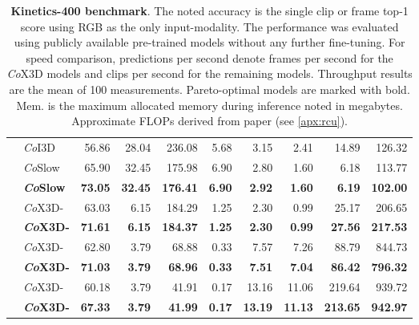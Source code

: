 \documentclass[runningheads]{llncs}
\begin{document}
\begin{table}[t]
\begin{center}
{\begin{tabular}{llrrrrrrrr}
    & \textit{Co}I3D             & 56.86     & 28.04    & 236.08    & 5.68       & 3.15   & 2.41     & 14.89     & 126.32 \\
    & \textit{Co}Slow             & 65.90     & 32.45    & 175.98    & 6.90       & 2.80   & 1.60     & 6.18      & 113.77 \\
    & \textbf{\textit{Co}Slow}    & \textbf{73.05}  & \textbf{32.45}  & \textbf{176.41}  & \textbf{6.90}   & \textbf{2.92}   & \textbf{1.60}  & \textbf{6.19} & \textbf{102.00}  \\
    & \textit{Co}X3D-    & 63.03     & 6.15     & 184.29    & 1.25       & 2.30   & 0.99     & 25.17     & 206.65 \\
    & \textbf{\textit{Co}X3D-}    & \textbf{71.61}     & \textbf{6.15}    & \textbf{184.37}     & \textbf{1.25}      &  \textbf{2.30}   & \textbf{0.99}       & \textbf{27.56}       & \textbf{217.53}  \\
    & \textit{Co}X3D-    & 62.80     & 3.79    & 68.88     & 0.33      & 7.57   & 7.26       & 88.79      & 844.73  \\
    & \textbf{\textit{Co}X3D-}    & \textbf{71.03}     & \textbf{3.79}    & \textbf{68.96}    & \textbf{0.33}      & \textbf{7.51}   & \textbf{7.04}       & \textbf{86.42}      & \textbf{796.32}  \\
    & \textit{Co}X3D-    & 60.18     & 3.79    & 41.91     & 0.17      & 13.16  & 11.06      & 219.64      & 939.72 \\
    & \textbf{\textit{Co}X3D-}    & \textbf{67.33}     & \textbf{3.79}    & \textbf{41.99}     & \textbf{0.17}      & \textbf{13.19}  & \textbf{11.13}     & \textbf{213.65}      & \textbf{942.97} \\
    \bottomrule
\end{tabular}
}
\end{center}
\caption{
    \textbf{Kinetics-400 benchmark}. The noted accuracy is the single clip or frame top-1 score using RGB as the only input-modality. 
    The performance was evaluated using publicly available pre-trained models without any further fine-tuning. For speed comparison, predictions per second denote frames per second for the \textit{Co}X3D models and clips per second for the remaining models. Throughput results are the mean of 100 measurements. 
    Pareto-optimal models are marked with bold.
    Mem. is the maximum allocated memory during inference noted in megabytes.
    Approximate FLOPs derived from paper (see \cref{apx:rcu}).
}
\label{tab:benchmark-kinetics400}
\vspace{-9mm}
\end{table}
\end{document}
